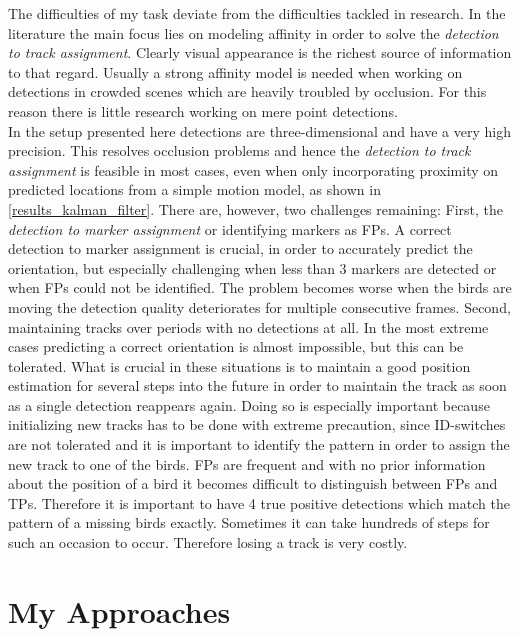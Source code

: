 \documentclass{article}
\begin{document}
The difficulties of my task deviate from the difficulties tackled in research. In the literature the main focus lies on modeling affinity in order to solve the \emph{detection to track assignment}. Clearly visual appearance is the richest source of information to that regard. Usually a strong affinity model is needed when working on detections in crowded scenes which are heavily troubled by occlusion. For this reason there is little research working on mere point detections.\\
In the setup presented here detections are three-dimensional and have a very high precision. This resolves occlusion problems and hence the \emph{detection to track assignment} is feasible in most cases, even when only incorporating proximity on predicted locations from a simple motion model, as shown in \ref{results_kalman_filter}. There are, however, two challenges remaining:
First, the \emph{detection to marker assignment} or identifying markers as FPs. A correct detection to marker assignment is crucial, in order to accurately predict the orientation, but especially challenging when less than 3 markers are detected or when FPs could not be identified. The problem becomes worse when the birds are moving the detection quality deteriorates for multiple consecutive frames.
Second, maintaining tracks over periods with no detections at all. In the most extreme cases predicting a correct orientation is almost impossible, but this can be tolerated. What is crucial in these situations is to maintain a good position estimation for several steps into the future in order to maintain the track as soon as a single detection reappears again. Doing so is especially important because initializing new tracks has to be done with extreme precaution, since ID-switches are not tolerated and it is important to identify the pattern in order to assign the new track to one of the birds. FPs are frequent and with no prior information about the position of a bird it becomes difficult to distinguish between FPs and TPs. Therefore it is important to have 4 true positive detections which match  the pattern of a missing birds exactly. Sometimes it can take hundreds of steps for such an occasion to occur. Therefore losing a track is very costly. %

\section{My Approaches}
\end{document}
